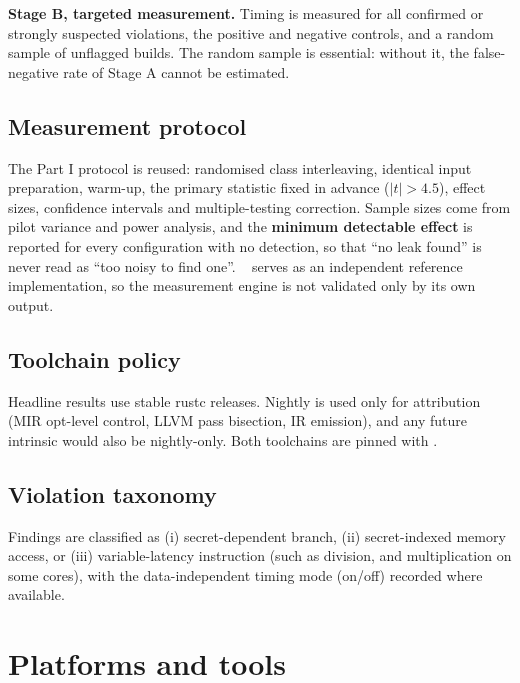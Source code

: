 \textbf{Stage B, targeted measurement.} Timing is measured for all confirmed or strongly suspected violations, the positive and negative controls, and a random sample of unflagged builds. The random sample is essential: without it, the false-negative rate of Stage A cannot be estimated.

\subsection{Measurement protocol}

The Part I protocol is reused: randomised class interleaving, identical input preparation, warm-up, the primary statistic fixed in advance ($\lvert t\rvert > 4.5$), effect sizes, confidence intervals and multiple-testing correction. Sample sizes come from pilot variance and power analysis, and the \textbf{minimum detectable effect} is reported for every configuration with no detection, so that ``no leak found'' is never read as ``too noisy to find one''. ~\cite{dudectbencher} serves as an independent reference implementation, so the measurement engine is not validated only by its own output.

\subsection{Toolchain policy}

Headline results use stable rustc releases. Nightly is used only for attribution (MIR opt-level control, LLVM pass bisection, IR emission), and any future  intrinsic would also be nightly-only. Both toolchains are pinned with .

\subsection{Violation taxonomy}

Findings are classified as (i) secret-dependent branch, (ii) secret-indexed memory access, or (iii) variable-latency instruction (such as division, and multiplication on some cores), with the data-independent timing mode (on/off) recorded where available.

\section{Platforms and tools}

